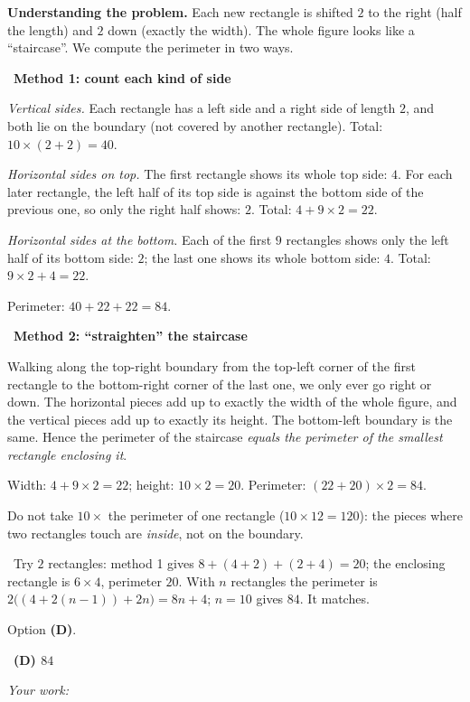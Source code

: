 \documentclass[11pt]{article}
\newif\ifsol \solfalse
\providecommand{\AnsWord}{Đáp số}
\newcommand{\ans}[1]{\par\smallskip{\bfseries\color{tmGreen!88!black}\AnsWord:}\ {\bfseries\color{AnsRed}#1}\par}
\newcommand{\probsol}[1]{%
  \begin{lrbox}{\solmeasure}\begin{minipage}{\dimexpr\linewidth-24pt\relax}#1\end{minipage}\end{lrbox}%
  \ifsol
    \begin{solbox}#1\end{solbox}%
  \else
    \setlength{\solht}{\dimexpr\ht\solmeasure+\dp\solmeasure+0.85cm\relax}%
    \ifdim\solht<1.35cm\setlength{\solht}{1.35cm}\fi
    \ifdim\solht>\StudentMaxWork\setlength{\solht}{\StudentMaxWork}\fi
    \begin{tcolorbox}[colback=white,colframe=Line,boxrule=0.8pt,arc=5pt,
      left=8pt,right=8pt,top=4pt,bottom=4pt,height=\solht]{\footnotesize\color{Slate}\itshape\WorkWord}\end{tcolorbox}%
  \fi}
\newlength{\StudentMaxWork}\setlength{\StudentMaxWork}{7.5cm}
\newcommand{\step}[2]{\par\smallskip\noindent{\bfseries\color{tmBlue!85!black}\StepWord~#1.}\ {\bfseries #2}\par\nopagebreak}
\newcommand{\verify}[1]{\par\smallskip\noindent{\bfseries\color{tmGreen!80!black}\faCheckCircle\ \CheckWord}\ #1\par}
\def\WorkWord{Your work:}
\def\AnsWord{Answer}
\def\StepWord{Step}
\def\CheckWord{Check:}
\begin{document}
\probsol{
\textbf{Understanding the problem.} Each new rectangle is shifted $2$ to the right (half the length) and $2$ down
(exactly the width). The whole figure looks like a ``staircase''. We compute the perimeter in two ways.

\step{1}{Method 1: count each kind of side}
\emph{Vertical sides.} Each rectangle has a left side and a right side of length $2$, and both lie on the
boundary (not covered by another rectangle). Total: $10\times(2+2)=40$.

\emph{Horizontal sides on top.} The first rectangle shows its whole top side: $4$. For each later rectangle, the
left half of its top side is against the bottom side of the previous one, so only the right half shows: $2$.
Total: $4+9\times 2=22$.

\emph{Horizontal sides at the bottom.} Each of the first $9$ rectangles shows only the left half of its bottom
side: $2$; the last one shows its whole bottom side: $4$. Total: $9\times 2+4=22$.

Perimeter: $40+22+22=84$.

\step{2}{Method 2: ``straighten'' the staircase}
\begin{proofbox}Walking along the top-right boundary from the top-left corner of the first rectangle to the
bottom-right corner of the last one, we only ever go right or down. The horizontal pieces add up to exactly the
width of the whole figure, and the vertical pieces add up to exactly its height. The bottom-left boundary is the
same. Hence the perimeter of the staircase \emph{equals the perimeter of the smallest rectangle enclosing
it}.\end{proofbox}
Width: $4+9\times 2=22$; height: $10\times 2=20$. Perimeter: $(22+20)\times 2=84$.

\begin{warnbox}Do not take $10\times$ the perimeter of one rectangle ($10\times 12=120$): the pieces where two
rectangles touch are \emph{inside}, not on the boundary.\end{warnbox}
\verify{Try $2$ rectangles: method 1 gives $8+(4+2)+(2+4)=20$; the enclosing rectangle is $6\times 4$, perimeter
$20$. With $n$ rectangles the perimeter is $2\big((4+2(n-1))+2n\big)=8n+4$; $n=10$ gives $84$. It matches.}
Option \textbf{(D)}.
\ans{(D) $84$}
}
\end{document}
